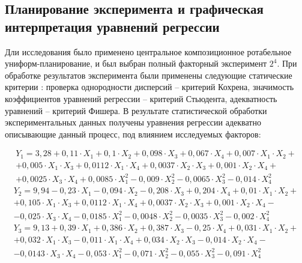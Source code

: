 \subsection{Планирование эксперимента и графическая интерпретация уравнений регрессии}
Дли исследования было применено центральное композиционное ротабельное униформ-планирование,
и был выбран полный факторный эксперимент $2^4$.
При обработке результатов эксперимента были применены следующие статические критерии :
проверка однородности дисперсий -- критерий Кохрена, значимость коэффициентов уравнений
регрессии -- критерий Стьюдента, адекватность уравнений -- критерий Фишера. В результате
статистической обработки экспериментальных  данных получены уравнения регрессии адекватно
описывающие данный процесс, под влиянием исследуемых факторов:

\begin{eqnarray}
\label{regress1}
Y_{1}=3,28+0,11\cdot X_{1}+0,1\cdot X_{2}+0,098\cdot X_{3}+0,067\cdot X_{4}+0,007\cdot
X_{1}\cdot X_{2}+\nonumber \\+0,005\cdot X_{1}\cdot X_{3}+0,0112\cdot X_{1}\cdot
X_{4}+0,0037\cdot X_{2}\cdot X_{3}+0,001\cdot X_{2}\cdot X_{4}+ \\+0,0025\cdot
X_{3}\cdot X_{4}+0,0085\cdot X_{1}^{2}-0,009\cdot X_{2}^{2}-0,0065\cdot
X_{3}^{2}-0,014\cdot
X_{4}^{2}~~~~\nonumber 
\end{eqnarray}
\begin{eqnarray}
\label{regress2}
Y_{2}=9,94-0,23\cdot X_{1}-0,094\cdot X_{2}-0,208\cdot X_{3}+0,204\cdot X_{4}+0,01\cdot
X_{1}\cdot X_{2}+\nonumber \\+0,105\cdot X_{1}\cdot X_{3}+0,0112\cdot X_{1}\cdot
X_{4}+0,0037\cdot X_{2}\cdot X_{3}+0,001\cdot X_{2}\cdot X_{4}-\\-0,025\cdot
X_{3}\cdot X_{4}-0,0185\cdot X_{1}^{2}-0,0048\cdot X_{2}^{2}-0,0035\cdot
X_{3}^{2}-0,002\cdot X_{4}^{2}~~~~\nonumber 
\end{eqnarray}
\begin{eqnarray}
\label{regress3}
Y_{3}=9,13+0,39\cdot X_{1}+0,386\cdot X_{2}+0,387\cdot X_{3}-0,25\cdot X_{4}+0,031\cdot
X_{1}\cdot X_{2}+\nonumber \\+0,032\cdot X_{1}\cdot X_{3}-0,011\cdot X_{1}\cdot
X_{4}+0,034\cdot X_{2}\cdot X_{3}-0,014\cdot X_{2}\cdot X_{4}- \\-0,0143\cdot
X_{3}\cdot X_{4}-0,053\cdot X_{1}^{2}-0,071\cdot X_{2}^{2}-0,055\cdot  X_{3}^{2}-0,091\cdot
X_{4}^{2}~~~~\nonumber 
\end{eqnarray}

